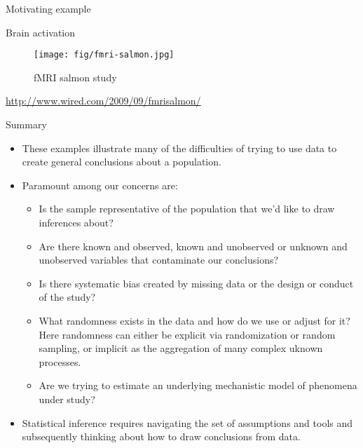 \documentclass[
  ignorenonframetext,
]{beamer}
\providecommand{\tightlist}{%
  \setlength{\itemsep}{0pt}\setlength{\parskip}{0pt}}
\begin{document}
\begin{frame}{Motivating example}
\protect\hypertarget{motivating-example}{}

\begin{block}{Brain activation}

\begin{figure}
\centering
\texttt{[image: fig/fmri-salmon.jpg]}
\caption{fMRI salmon study}
\end{figure}

\url{http://www.wired.com/2009/09/fmrisalmon/}

\end{block}

\end{frame}

\begin{frame}{Summary}
\protect\hypertarget{summary}{}

\begin{itemize}
\tightlist
\item
  These examples illustrate many of the difficulties of trying to use
  data to create general conclusions about a population.
\item
  Paramount among our concerns are:

  \begin{itemize}
  \tightlist
  \item
    Is the sample representative of the population that we'd like to
    draw inferences about?
  \item
    Are there known and observed, known and unobserved or unknown and
    unobserved variables that contaminate our conclusions?
  \item
    Is there systematic bias created by missing data or the design or
    conduct of the study?
  \item
    What randomness exists in the data and how do we use or adjust for
    it? Here randomness can either be explicit via randomization or
    random sampling, or implicit as the aggregation of many complex
    uknown processes.
  \item
    Are we trying to estimate an underlying mechanistic model of
    phenomena under study?
  \end{itemize}
\item
  Statistical inference requires navigating the set of assumptions and
  tools and subsequently thinking about how to draw conclusions from
  data.
\end{itemize}

\end{frame}
\end{document}
